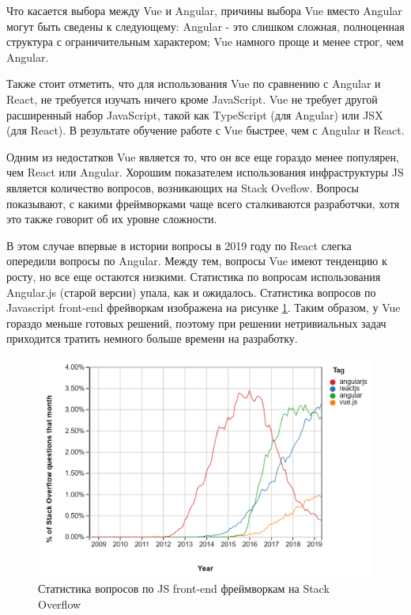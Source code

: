 Что касается выбора между Vue и Angular, причины выбора Vue вместо Angular могут быть сведены к следующему: Angular - это слишком сложная, полноценная структура с ограничительным характером; Vue намного проще и менее строг, чем Angular.

Также стоит отметить, что для использования Vue по сравнению с Angular и React, не требуется изучать ничего кроме JavaScript. Vue не требует другой расширенный набор JavaScript, такой как TypeScript (для Angular) или JSX (для React). В результате обучение работе с Vue быстрее, чем с Angular и React.

Одним из недостатков Vue является то, что он все еще гораздо менее популярен, чем React или Angular. Хорошим показателем использования инфраструктуры JS является количество вопросов, возникающих на Stack Oveflow. Вопросы показывают, с какими фреймворками чаще всего сталкиваются разработчки, хотя это также говорит об их уровне сложности.

В этом случае впервые в истории вопросы в 2019 году по React слегка опередили вопросы по Angular. Между тем, вопросы Vue имеют тенденцию к росту, но все еще остаются низкими. Статистика по вопросам использования Angular.js (старой версии) упала, как и ожидалось. Статистика вопросов по Javascript front-end фрейворкам изображена на рисунке \ref{img:vuejsstat}. Таким образом, у Vue гораздо меньше готовых решений, поэтому при решении нетривиальных задач приходится тратить немного больше времени на разработку. 

\begin{figure}[h!]
	\centering
	\includegraphics[width = \linewidth]{img/vuejsstat}
	\caption{Статистика вопросов по JS front-end фреймворкам на Stack Overflow}
	\label{img:vuejsstat}
\end{figure}

